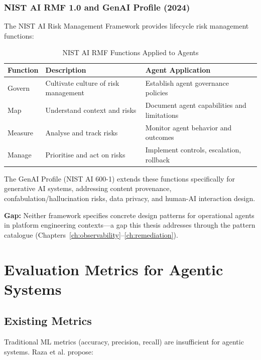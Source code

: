 \subsubsection{NIST AI RMF 1.0 and GenAI Profile (2024)}

The NIST AI Risk Management Framework provides lifecycle risk management functions:

\begin{table}[htbp]
\centering
\caption{NIST AI RMF Functions Applied to Agents}
\label{tab:nist-ai-rmf}
\begin{tabular}{lll}
\toprule
\textbf{Function} & \textbf{Description} & \textbf{Agent Application} \\
\midrule
Govern & Cultivate culture of risk management & Establish agent governance policies \\
Map & Understand context and risks & Document agent capabilities and limitations \\
Measure & Analyse and track risks & Monitor agent behavior and outcomes \\
Manage & Prioritise and act on risks & Implement controls, escalation, rollback \\
\bottomrule
\end{tabular}
\end{table}

The GenAI Profile (NIST AI 600-1) extends these functions specifically for generative AI systems, addressing content provenance, confabulation/hallucination risks, data privacy, and human-AI interaction design.

\textbf{Gap:} Neither framework specifies concrete design patterns for operational agents in platform engineering contexts---a gap this thesis addresses through the pattern catalogue (Chapters~\ref{ch:observability}--\ref{ch:remediation}).

\section{Evaluation Metrics for Agentic Systems}
\label{sec:evaluation-metrics}

\subsection{Existing Metrics}
\label{subsec:existing-metrics}

Traditional ML metrics (accuracy, precision, recall) are insufficient for agentic systems. Raza et al. \citep{raza2025} propose:

